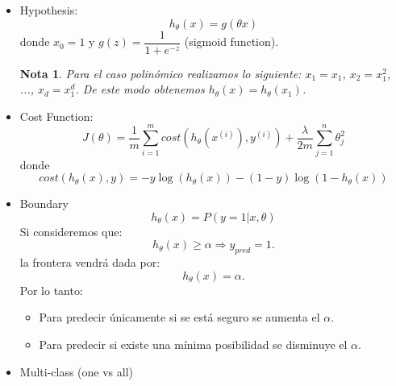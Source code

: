 \documentclass[12pt,a4paper]{article}
\newtheorem{nota}{Nota}[subsection]
\begin{document}
\begin{itemize}
\item Hypothesis:
\begin{equation*}
h_\theta(x) = g(\theta x) 
\end{equation*}
donde $x_0=1$ y $g(z)=\dfrac{1}{1+e^{-z}}$ (sigmoid function).
\begin{nota}
Para el caso polinómico realizamos lo siguiente: $x_1=x_1$, $x_2=x_1^2$, ..., $x_d=x_1^d$. De este modo obtenemos $h_\theta(x)=h_\theta(x_1)$.
\end{nota}
\item Cost Function:
\begin{equation*}
J(\theta) = \dfrac{1}{m} \sum_{i=1}^{m} cost(h_{\theta}(x^{(i)}),y^{(i)}) + \dfrac{\lambda}{2 m} \sum_{j=1}^{n} \theta_{j}^{2} 
\end{equation*}
donde
\begin{equation*}
cost(h_{\theta}(x),y)=-y \log(h_{\theta}(x)) - (1-y) \log(1-h_{\theta}(x))  
\end{equation*}
\item Boundary
\begin{equation}
h_{\theta}(x) = P(y=1|x,\theta)
\end{equation}
Si consideremos que:
\begin{equation*}
h_{\theta}(x) \geq \alpha \Rightarrow y_{pred} = 1.
\end{equation*}
la frontera vendrá dada por:
\begin{equation*}
h_{\theta}(x) = \alpha.
\end{equation*}
Por lo tanto:
\begin{itemize}
\item Para predecir únicamente si se está seguro se aumenta el $\alpha$.
\item Para predecir si existe una mínima posibilidad se disminuye el $\alpha$.
\end{itemize}

\item Multi-class (one vs all)


\end{itemize}
\end{document}
